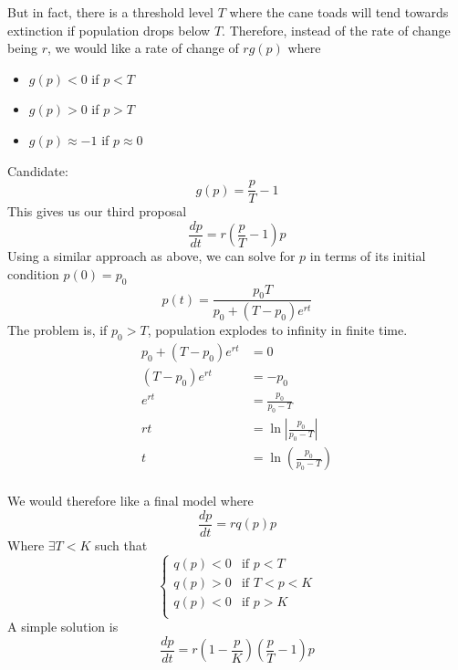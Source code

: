 \documentclass[12pt]{article}
\begin{document}
But in fact, there is a threshold level $T$ where the cane toads will tend towards extinction if population drops below $T$. Therefore, instead of the rate of change being $r$, we would like a rate of change of $rg(p)$ where
\begin{itemize}
	\item $g(p) < 0$ if $p < T$ \\
	\item $g(p) > 0$ if $p > T$ \\
	\item $g(p) \approx -1$ if $p \approx 0$ \\
\end{itemize}
Candidate:
$$g(p) = \frac{p}{T} - 1$$
This gives us our third proposal
$$\frac{dp}{dt} = r\left(\frac{p}{T} - 1\right)p$$
Using a similar approach as above, we can solve for $p$ in terms of its initial condition $p(0) = p_0$
$$p(t) = \frac{p_0T}{p_0 + (T-p_0)e^{rt}}$$
The problem is, if $p_0 > T$, population explodes to infinity in finite time.
\begin{align*}
	p_0 + (T-p_0)e^{rt} &= 0 \\
	(T-p_0)e^{rt} &= -p_0 \\
	e^{rt} &= \frac{p_0}{p_0-T} \\
	rt &= \ln\left|\frac{p_0}{p_0-T}\right| \\
	t &= \ln\left(\frac{p_0}{p_0-T}\right) \\
\end{align*}

We would therefore like a final model where
$$\frac{dp}{dt} = rq(p)p$$
Where $\exists T < K$ such that
$$\begin{cases}
	q(p) < 0 & \text{if } p < T \\
	q(p) > 0 & \text{if } T < p < K \\
	q(p) < 0 & \text{if } p > K \\
\end{cases}$$
A simple solution is
$$\frac{dp}{dt} = r\left(1-\frac{p}{K}\right)\left(\frac{p}{T}-1\right)p$$
\end{document}
